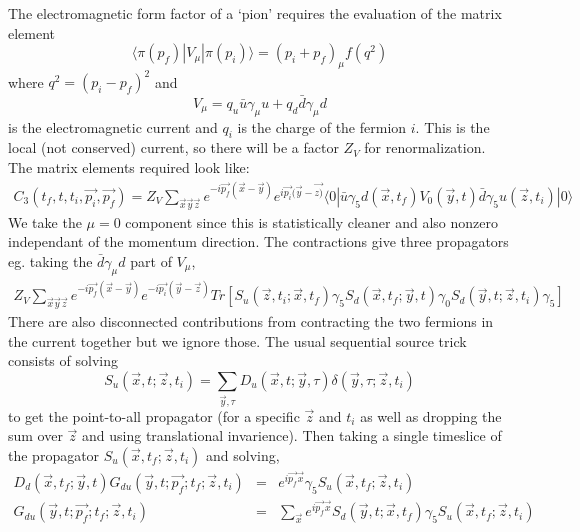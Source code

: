 \documentclass[3p,preprint]{elsarticle}
\begin{document}
The electromagnetic form factor of a `pion' requires the evaluation of the matrix element
\begin{equation}
\langle \pi(p_f) | V_\mu | \pi(p_i) \rangle = (p_i + p_f)_\mu f(q^2)
\end{equation}
where $q^2 = (p_i - p_f)^2$ and
\begin{equation}
V_\mu = q_u \bar{u} \gamma_\mu u + q_d \bar{d} \gamma_\mu d
\end{equation}
is the electromagnetic current and $q_i$ is the charge of the fermion $i$. This is the local (not
conserved) current, so there will be a factor $Z_V$ for renormalization.
The matrix elements required look like:
\begin{eqnarray}
C_3(t_f,t,t_i,\vec{p_i}, \vec{p_f}) = Z_V \sum_{\vec{x} \vec{y} \vec{z}} e^{-i\vec{p_f}(\vec{x} - \vec{y}) } e^{i\vec{p_i} (\vec{y} - \vec{z)}}\langle 0 | \bar{u} \gamma_5 d ( \vec{x}, t_f)  V_0(\vec{y}, t) \bar{d} \gamma_5 u (\vec{z}, t_i) | 0 \rangle
\end{eqnarray}
We take the $\mu = 0$ component since this is statistically cleaner and also nonzero
independant of the momentum direction. The contractions give three propagators eg. taking the $\bar{d} \gamma_\mu d$ part of $V_\mu$,
\begin{eqnarray}
Z_V \sum_{\vec{x} \vec{y} \vec{z}} e^{-i\vec{p_f}(\vec{x} - \vec{y}) } e^{-i\vec{p_i} (\vec{y} - \vec{z} ) } Tr \left[ S_u(\vec{z},t_i;\vec{x},t_f) \gamma_5 S_d(\vec{x},t_f;\vec{y},t)  \gamma_0 S_d(\vec{y},t;\vec{z},t_i) \gamma_5  \right]
\end{eqnarray}
There are also disconnected contributions from contracting the two fermions in the current together but we ignore those.
The usual sequential source trick consists of solving
\begin{equation}
S_u(\vec{x}, t; \vec{z}, t_i) = \sum_{\vec{y},\tau} D_u ( \vec{x}, t; \vec{y},\tau)  \delta(\vec{y}, \tau; \vec{z}, t_i)
\end{equation}
to get the point-to-all propagator (for a specific $\vec{z}$ and $t_i$ as well as dropping the sum over $\vec{z}$
and using translational invarience). Then taking a single timeslice of the propagator $S_u(\vec{x}, t_f; \vec{z}, t_i)$
and solving,
\begin{eqnarray}
D_d ( \vec{x},t_f; \vec{y}, t ) G_{du}(\vec{y}, t; \vec{p_f}; t_f; \vec{z}, t_i) &=& e^{i\vec{p_f} \vec{x}} \gamma_5 S_u(\vec{x}, t_f; \vec{z}, t_i) \\
G_{du}(\vec{y}, t; \vec{p_f}; t_f; \vec{z}, t_i) &=& \sum_{ \vec{x} } e^{i\vec{p_f} \vec{x}} S_d(\vec{y},t; \vec{x}, t_f ) \gamma_5 S_u(\vec{x}, t_f; \vec{z}, t_i)
\end{eqnarray}
\end{document}
